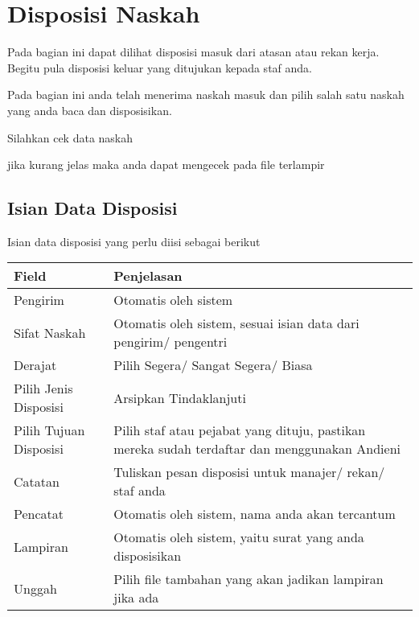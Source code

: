 \documentclass[letterpaper,10pt,bahasai]{sphinxmanual}
\begin{document}
\noindent{}


\chapter{Disposisi Naskah}
\label{\detokenize{disposisi:disposisi-naskah}}\label{\detokenize{disposisi::doc}}
Pada bagian ini dapat dilihat disposisi masuk dari atasan atau rekan kerja. Begitu pula disposisi keluar yang ditujukan kepada staf anda.

\noindent{}

Pada bagian ini anda telah menerima naskah masuk dan pilih salah satu naskah yang anda baca dan disposisikan.

\noindent{}

Silahkan cek data naskah

\noindent{}

jika kurang jelas maka anda dapat mengecek pada file terlampir

\noindent{}


\section{Isian Data Disposisi}
\label{\detokenize{disposisi:isian-data-disposisi}}
Isian data disposisi yang perlu diisi sebagai berikut


\begin{savenotes}\sphinxattablestart
\centering
\begin{tabulary}{\linewidth}[t]{|T|T|}
\hline
\sphinxstyletheadfamily 
Field
&\sphinxstyletheadfamily 
Penjelasan
\\
\hline
Pengirim
&
Otomatis oleh sistem
\\
\hline
Sifat Naskah
&
Otomatis oleh sistem, sesuai isian data dari pengirim/ pengentri
\\
\hline
Derajat
&
Pilih Segera/ Sangat Segera/ Biasa
\\
\hline
Pilih Jenis Disposisi
&
Arsipkan
Tindaklanjuti
\\
\hline
Pilih Tujuan Disposisi
&
Pilih staf atau pejabat yang dituju, pastikan mereka sudah terdaftar
dan menggunakan Andieni
\\
\hline
Catatan
&
Tuliskan pesan disposisi untuk manajer/ rekan/ staf anda
\\
\hline
Pencatat
&
Otomatis oleh sistem, nama anda akan tercantum
\\
\hline
Lampiran
&
Otomatis oleh sistem, yaitu surat yang anda disposisikan
\\
\hline
Unggah
&
Pilih file tambahan yang akan jadikan lampiran jika ada
\\
\hline
\end{tabulary}
\par
\sphinxattableend\end{savenotes}
\end{document}

